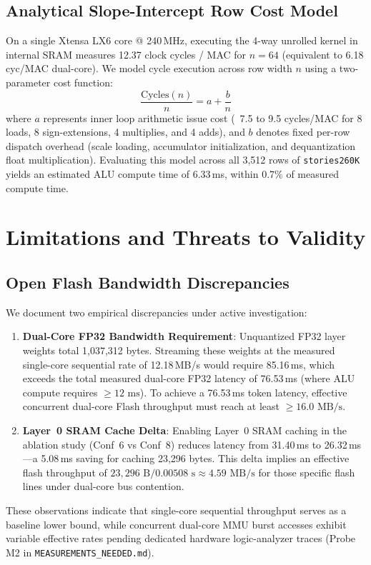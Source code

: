 \documentclass[10pt,a4paper]{article}
\begin{document}
\subsection{Analytical Slope-Intercept Row Cost Model}
On a single Xtensa LX6 core @ 240\,MHz, executing the 4-way unrolled kernel in internal SRAM measures 12.37 clock cycles / MAC for $n=64$ (equivalent to 6.18 cyc/MAC dual-core). We model cycle execution across row width $n$ using a two-parameter cost function:
\begin{equation}
    \frac{\text{Cycles}(n)}{n} = a + \frac{b}{n}
\end{equation}
where $a$ represents inner loop arithmetic issue cost (~7.5 to 9.5 cycles/MAC for 8 loads, 8 sign-extensions, 4 multiplies, and 4 adds), and $b$ denotes fixed per-row dispatch overhead (scale loading, accumulator initialization, and dequantization float multiplication). Evaluating this model across all 3,512 rows of \texttt{stories260K} yields an estimated ALU compute time of 6.33\,ms, within 0.7\% of measured compute time.

\section{Limitations and Threats to Validity}
\label{sec:limitations}

\subsection{Open Flash Bandwidth Discrepancies}
We document two empirical discrepancies under active investigation:
\begin{enumerate}
    \item \textbf{Dual-Core FP32 Bandwidth Requirement}: Unquantized FP32 layer weights total 1,037,312 bytes. Streaming these weights at the measured single-core sequential rate of 12.18\,MB/s would require 85.16\,ms, which exceeds the total measured dual-core FP32 latency of 76.53\,ms (where ALU compute requires $\ge 12\text{ ms}$). To achieve a 76.53\,ms token latency, effective concurrent dual-core Flash throughput must reach at least $\ge 16.0\text{ MB/s}$.
    \item \textbf{Layer~0 SRAM Cache Delta}: Enabling Layer~0 SRAM caching in the ablation study (Conf~6 vs Conf~8) reduces latency from 31.40\,ms to 26.32\,ms—a 5.08\,ms saving for caching 23,296 bytes. This delta implies an effective flash throughput of $23,296\text{ B} / 0.00508\text{ s} \approx 4.59\text{ MB/s}$ for those specific flash lines under dual-core bus contention.
\end{enumerate}
These observations indicate that single-core sequential throughput serves as a baseline lower bound, while concurrent dual-core MMU burst accesses exhibit variable effective rates pending dedicated hardware logic-analyzer traces (Probe M2 in \texttt{MEASUREMENTS\_NEEDED.md}).
\end{document}
